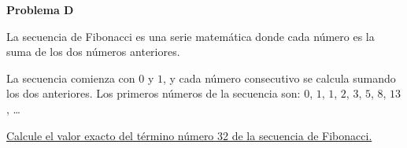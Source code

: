 \begin{center}
\Large \textbf{Problema D} \\
\end{center}

La secuencia de Fibonacci es una serie matemática donde cada número es la suma de los dos números anteriores.

\bigskip

La secuencia comienza con $0$ y $1$, y cada número consecutivo se calcula sumando los dos anteriores.
Los primeros números de la secuencia son: $0$, $1$, $1$, $2$, $3$, $5$, $8$, $13$, \ldots

\bigskip

\underline{Calcule el valor exacto del término número 32 de la secuencia de Fibonacci.}

